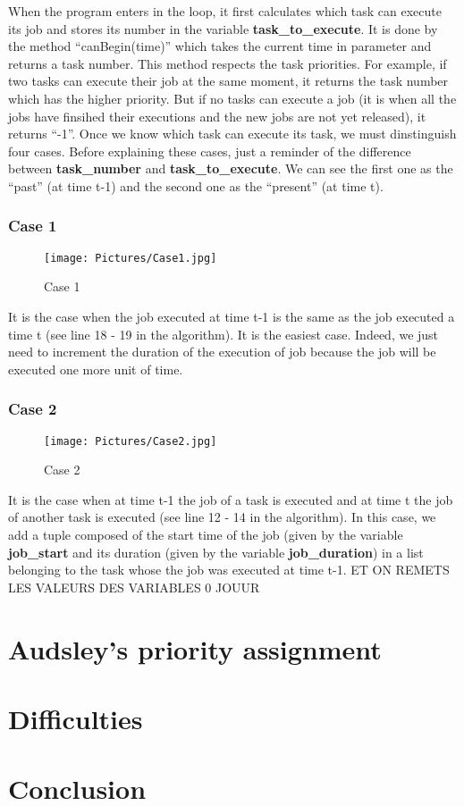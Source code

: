 \documentclass[a4paper,12pt]{article}
\begin{document}
\smallskip
\noindent
When the program enters in the loop, it first calculates which task can execute its job and stores its number in the variable \textbf{task\_to\_execute}. It is done by the method ``canBegin(time)'' which takes the current time in parameter and returns a task number. This method respects the task priorities. For example, if two tasks can execute their job at the same moment, it returns the task number which has the higher priority. But if no tasks can execute a job (it is when all the jobs have finsihed their executions and the new jobs are not yet released), it returns ``-1''. Once we know which task can execute its task, we must dinstinguish four cases. Before explaining these cases, just a reminder of the difference between \textbf{task\_number} and \textbf{task\_to\_execute}. We can see the first one as the ``past'' (at time t-1) and the second one as the ``present'' (at time t).

\subsubsection{Case 1}

\begin{figure}[h!]
  \centering
  \texttt{[image: Pictures/Case1.jpg]}
  \caption{Case 1}
  \label{fig: Case 1}
\end{figure}

\smallskip
\noindent
It is the case when the job executed at time t-1 is the same as the job executed a time t (see line 18 - 19 in the algorithm). It is the easiest case. Indeed, we just need to increment the duration of the execution of job because the job will be executed one more unit of time. 


\newpage

\subsubsection{Case 2}

\begin{figure}[h!]
  \centering
  \texttt{[image: Pictures/Case2.jpg]}
  \caption{Case 2}
  \label{fig: Case 2}
\end{figure}

\smallskip
\noindent
It is the case when at time t-1 the job of a task is executed and at time t the job of another task is executed (see line 12 - 14 in the algorithm). In this case, we add a tuple composed of the start time of the job (given by the variable \textbf{job\_start} and its duration (given by the variable \textbf{job\_duration}) in a list belonging to the task whose the job was executed at time t-1. ET ON REMETS LES VALEURS DES VARIABLES 0 JOUUR


\section{Audsley’s priority assignment}

\newpage

\section{Difficulties}

\newpage

\section{Conclusion}
\end{document}
